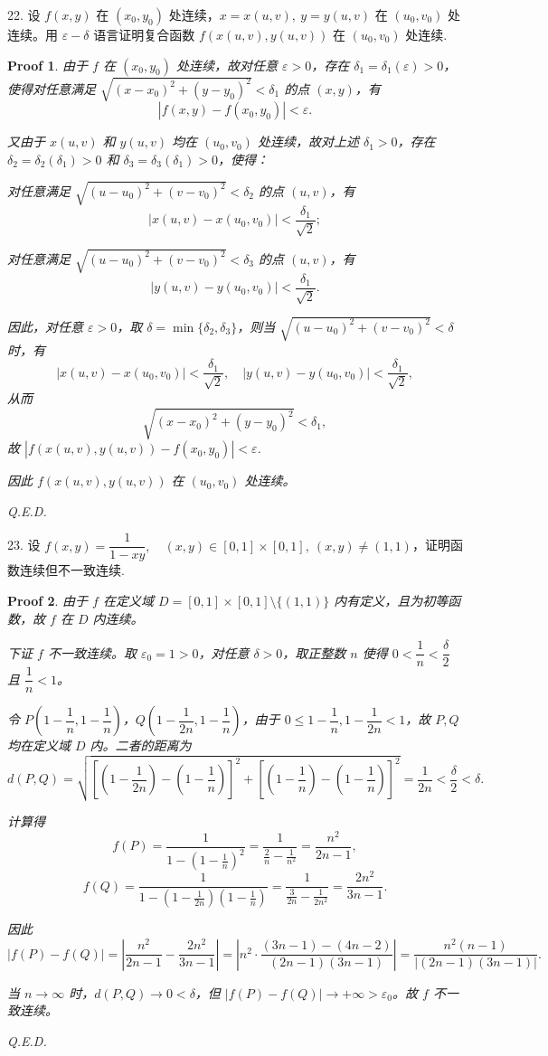 \documentclass[a4paper,12pt]{article}
\newtheorem*{pf}{Proof}
\begin{document}
22. 设 $f(x,y)$ 在 $(x_0,y_0)$ 处连续，$x = x(u,v),\ y = y(u,v)$ 在 $(u_0,v_0)$ 处连续。用 $\varepsilon-\delta$ 语言证明复合函数 $f(x(u,v), y(u,v))$ 在 $(u_0,v_0)$ 处连续.
\begin{pf}
    由于 $f$ 在 $(x_0,y_0)$ 处连续，故对任意 $\varepsilon>0$，存在 $\delta_1=\delta_1(\varepsilon)>0$，使得对任意满足 $\sqrt{(x-x_0)^2+(y-y_0)^2}<\delta_1$ 的点 $(x,y)$，有
    $$|f(x,y)-f(x_0,y_0)|<\varepsilon.$$

    又由于 $x(u,v)$ 和 $y(u,v)$ 均在 $(u_0,v_0)$ 处连续，故对上述 $\delta_1>0$，存在 $\delta_2=\delta_2(\delta_1)>0$ 和 $\delta_3=\delta_3(\delta_1)>0$，使得：

    对任意满足 $\sqrt{(u-u_0)^2+(v-v_0)^2}<\delta_2$ 的点 $(u,v)$，有
    $$|x(u,v)-x(u_0,v_0)|<\frac{\delta_1}{\sqrt{2}};$$

    对任意满足 $\sqrt{(u-u_0)^2+(v-v_0)^2}<\delta_3$ 的点 $(u,v)$，有
    $$|y(u,v)-y(u_0,v_0)|<\frac{\delta_1}{\sqrt{2}}.$$

    因此，对任意 $\varepsilon>0$，取 $\delta=\min\{\delta_2,\delta_3\}$，则当 $\sqrt{(u-u_0)^2+(v-v_0)^2}<\delta$ 时，有
    $$|x(u,v)-x(u_0,v_0)|<\frac{\delta_1}{\sqrt{2}},\quad |y(u,v)-y(u_0,v_0)|<\frac{\delta_1}{\sqrt{2}},$$
    从而
    $$\sqrt{(x-x_0)^2+(y-y_0)^2}<\delta_1,$$
    故 $|f(x(u,v),y(u,v))-f(x_0,y_0)|<\varepsilon$.

    因此 $f(x(u,v), y(u,v))$ 在 $(u_0,v_0)$ 处连续。

    Q.E.D.
\end{pf}


23. 设 $f(x,y) = \dfrac{1}{1-xy},\quad (x,y) \in [0,1] \times [0,1],\ (x,y) \neq (1,1)$，证明函数连续但不一致连续.
\begin{pf}
    由于 $f$ 在定义域 $D=[0,1]\times[0,1]\setminus\{(1,1)\}$ 内有定义，且为初等函数，故 $f$ 在 $D$ 内连续。

    下证 $f$ 不一致连续。取 $\varepsilon_0=1>0$，对任意 $\delta>0$，取正整数 $n$ 使得 $0<\dfrac{1}{n}<\dfrac{\delta}{2}$ 且 $\dfrac{1}{n}<1$。

    令 $P\left(1-\dfrac{1}{n},1-\dfrac{1}{n}\right)$，$Q\left(1-\dfrac{1}{2n},1-\dfrac{1}{n}\right)$，由于 $0\leq 1-\dfrac{1}{n},1-\dfrac{1}{2n}<1$，故 $P,Q$ 均在定义域 $D$ 内。二者的距离为
    $$d(P,Q)=\sqrt{\left[\left(1-\frac{1}{2n}\right)-\left(1-\frac{1}{n}\right)\right]^2+\left[\left(1-\frac{1}{n}\right)-\left(1-\frac{1}{n}\right)\right]^2}=\frac{1}{2n}<\frac{\delta}{2}<\delta.$$

    计算得
    $$f(P)=\frac{1}{1-\left(1-\frac{1}{n}\right)^2}=\frac{1}{\frac{2}{n}-\frac{1}{n^2}}=\frac{n^2}{2n-1},$$
    $$f(Q)=\frac{1}{1-\left(1-\frac{1}{2n}\right)\left(1-\frac{1}{n}\right)}=\frac{1}{\frac{3}{2n}-\frac{1}{2n^2}}=\frac{2n^2}{3n-1}.$$

    因此
    $$|f(P)-f(Q)|=\left|\frac{n^2}{2n-1}-\frac{2n^2}{3n-1}\right|=\left|n^2\cdot\frac{(3n-1)-(4n-2)}{(2n-1)(3n-1)}\right|=\frac{n^2(n-1)}{|(2n-1)(3n-1)|}.$$

    当 $n\to\infty$ 时，$d(P,Q)\to 0<\delta$，但 $|f(P)-f(Q)|\to+\infty>\varepsilon_0$。故 $f$ 不一致连续。

    Q.E.D.
\end{pf}
\end{document}
